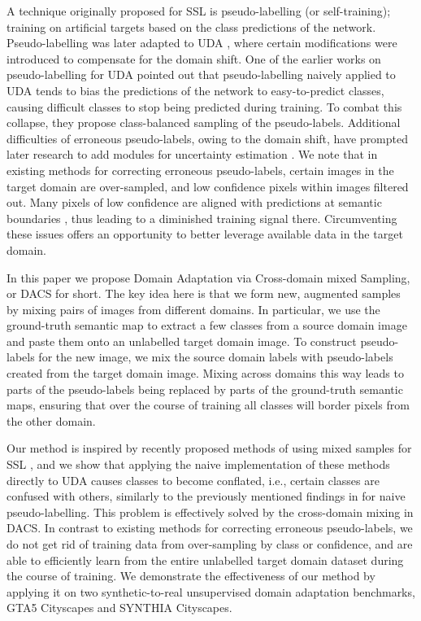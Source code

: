 \documentclass[10pt,twocolumn,letterpaper]{article}
\begin{document}
A technique originally proposed for SSL is pseudo-labelling \cite{pseudo-label} (or self-training); training on artificial targets based on the class predictions of the network. Pseudo-labelling was later adapted to UDA \cite{zou2018domain,zou2019confidence,zheng2020rectifying}, where certain modifications were introduced to compensate for the domain shift. One of the earlier works on pseudo-labelling for UDA \cite{zou2018domain} pointed out that pseudo-labelling naively applied to UDA tends to bias the predictions of the network to easy-to-predict classes, causing difficult classes to stop being predicted during training. To combat this collapse, they propose class-balanced sampling of the pseudo-labels. Additional difficulties of erroneous pseudo-labels, owing to the domain shift, have prompted later research to add modules for uncertainty estimation \cite{zou2019confidence,zheng2020rectifying}. We note that in existing methods for correcting erroneous pseudo-labels, certain images in the target domain are over-sampled, and low confidence pixels within images filtered out. Many pixels of low confidence are aligned with predictions at semantic boundaries \cite{li2017pixels,zhu2018improving,ClassMix}, thus leading to a diminished training signal there. Circumventing these issues offers an opportunity to better leverage available data in the target domain.




In this paper we propose Domain Adaptation via Cross-domain mixed Sampling, or DACS for short. The key idea here is that we form new, augmented samples by mixing pairs of images from different domains. In particular, we use the ground-truth semantic map to extract a few classes from a source domain image and paste them
onto an unlabelled target domain image. To construct pseudo-labels for the new image, we mix the source domain labels with pseudo-labels created from the target domain image.
Mixing across domains this way leads to parts of the pseudo-labels being replaced by parts of the ground-truth semantic maps, ensuring that over the course of training all classes will border pixels from the other domain.

Our method is inspired by recently proposed methods of using mixed samples for SSL \cite{French,StructuredLoss,ClassMix}, and we show that applying the naive implementation of these methods directly to UDA causes classes to become conflated, i.e., certain classes are confused with others, similarly to the previously mentioned findings in \cite{zou2018domain} for naive pseudo-labelling. This problem is effectively solved by the cross-domain mixing in DACS. In contrast to existing methods for correcting erroneous pseudo-labels, we do not get rid of training data from over-sampling by class or confidence, and are able to efficiently learn from the entire unlabelled target domain dataset during the course of training. We demonstrate the effectiveness of our method by applying it on two synthetic-to-real unsupervised domain adaptation benchmarks, GTA5  Cityscapes and SYNTHIA  Cityscapes.
\end{document}
